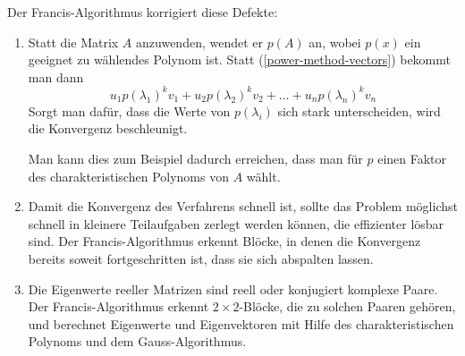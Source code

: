 Der Francis-Algorithmus korrigiert diese Defekte:
\begin{enumerate}
\item
Statt die Matrix $A$ anzuwenden, wendet er $p(A)$ an, wobei
$p(x)$ ein geeignet zu wählendes Polynom ist.
Statt (\ref{power-method-vectors}) bekommt man dann
\[
u_1p(\lambda_1)^kv_1+u_2p(\lambda_2)^kv_2+\dots+u_np(\lambda_n)^kv_n
\]
Sorgt man dafür, dass die Werte von $p(\lambda_i)$ sich stark
unterscheiden, wird die Konvergenz beschleunigt.

Man kann dies zum
Beispiel dadurch erreichen, dass man für $p$ einen Faktor des
charakteristischen Polynoms von $A$ wählt.
\item 
Damit die Konvergenz des Verfahrens schnell ist, sollte das Problem
möglichst schnell in kleinere Teilaufgaben zerlegt werden können,
die effizienter lösbar sind.
Der Francis-Algorithmus erkennt 
Blöcke, in denen die Konvergenz bereits soweit fortgeschritten
ist, dass sie sich abspalten lassen.
\item
Die Eigenwerte reeller Matrizen sind reell oder konjugiert komplexe
Paare.
Der Francis-Algorithmus erkennt $2\times 2$-Blöcke, die zu
solchen Paaren gehören, und berechnet Eigenwerte und Eigenvektoren
mit Hilfe des charakteristischen Polynoms und dem Gauss-Algorithmus.
\end{enumerate}
